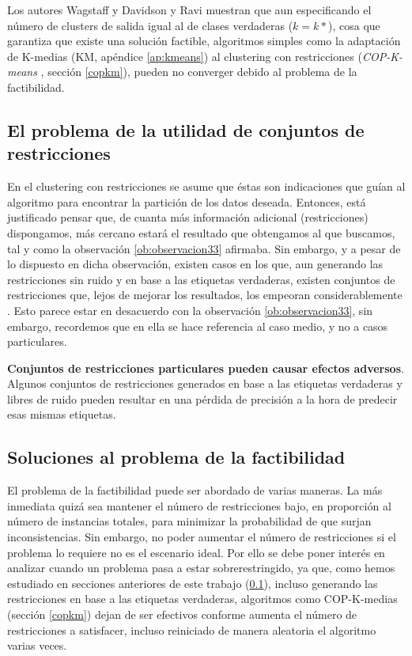 Los autores Wagstaff \cite{Wagstaff:2002} y Davidson y Ravi \cite{DavidsonRavi:2007} muestran que aun especificando el número de clusters de salida igual al de clases verdaderas ($k = k*$), cosa que garantiza que existe una solución factible, algoritmos simples como la adaptación de K-medias (\acs{KM}, apéndice \ref{ap:kmeans}) al clustering con restricciones (\textit{COP-K-means} \cite{Wagstaff:2001b}, sección \ref{copkm}), pueden no converger debido al problema de la factibilidad.

\subsection{El problema de la utilidad de conjuntos de restricciones} \label{ProbRestr}

En el clustering con restricciones se asume que éstas son indicaciones que guían al algoritmo para encontrar la partición de los datos deseada. Entonces, está justificado pensar que, de cuanta más información adicional (restricciones) dispongamos, más cercano estará el resultado que obtengamos al que buscamos, tal y como la observación \ref{ob:observacion33} afirmaba. Sin embargo, y a pesar de lo dispuesto en dicha observación, existen casos en los que, aun generando las restricciones sin ruido y en base a las etiquetas verdaderas, existen conjuntos de restricciones que, lejos de mejorar los resultados, los empeoran considerablemente \cite{DavidsonRaviWagstaff:2006}. Esto parece estar en desacuerdo con la observación \ref{ob:observacion33}, sin embargo, recordemos que en ella se hace referencia al caso medio, y no a casos particulares.

\begin{observacion}
	
	\textbf{Conjuntos de restricciones particulares pueden causar efectos adversos}. Algunos conjuntos de restricciones generados en base a las etiquetas verdaderas y libres de ruido pueden resultar en una pérdida de precisión a la hora de predecir esas mismas etiquetas. \cite{Survey:2007}
	
\end{observacion}

\subsection{Soluciones al problema de la factibilidad}

El problema de la factibilidad puede ser abordado de varias maneras. La más inmediata quizá sea mantener el número de restricciones bajo, en proporción al número de instancias totales, para minimizar la probabilidad de que surjan inconsistencias. Sin embargo, no poder aumentar el número de restricciones si el problema lo requiere no es el escenario ideal. Por ello se debe poner interés en analizar cuando un problema pasa a estar sobrerestringido, ya que, como hemos estudiado en secciones anteriores de este trabajo (\ref{ProbRestr}), incluso generando las restricciones en base a las etiquetas verdaderas, algoritmos como COP-K-medias (sección \ref{copkm}) dejan de ser efectivos conforme aumenta el número de restricciones a satisfacer, incluso reiniciado de manera aleatoria el algoritmo varias veces.

